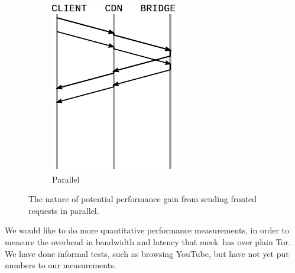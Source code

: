 \documentclass[conference]{IEEEtran}
\def\meek{meek}
\begin{document}
\begin{figure}
\begin{subfigure}[t]{0.40\linewidth}
\includegraphics[width=\linewidth]{wire-parallel}
\caption{Parallel}
\label{fig:wire-parallel}
\end{subfigure}

\caption{
The nature of potential performance gain
from sending fronted requests in parallel.
}
\label{fig:wire}
\end{figure}

We would like to do more quantitative performance measurements,
in order to measure the overhead in bandwidth and latency that \meek\ has over plain Tor.
We have done informal tests, such as browsing YouTube,
but have not yet put numbers to our measurements.


\end{document}
